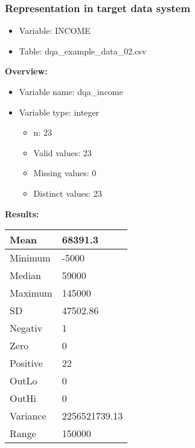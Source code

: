 \documentclass[
]{article}
\providecommand{\tightlist}{%
  \setlength{\itemsep}{0pt}\setlength{\parskip}{0pt}}
\begin{document}
\newpage

\hypertarget{representation-in-target-data-system-7}{%
\subsubsection{\texorpdfstring{Representation in \textbf{target} data
system}{Representation in target data system}}\label{representation-in-target-data-system-7}}

\begin{itemize}
\tightlist
\item
  Variable: INCOME
\item
  Table: dqa\_example\_data\_02.csv
\end{itemize}

\textbf{Overview:}

\begin{itemize}
\tightlist
\item
  Variable name: dqa\_income
\item
  Variable type: integer

  \begin{itemize}
  \tightlist
  \item
    n: 23
  \item
    Valid values: 23
  \item
    Missing values: 0
  \item
    Distinct values: 23
  \end{itemize}
\end{itemize}

\textbf{Results:}\\

\begin{table}[H]
\centering
\begin{tabular}{l|l}
\hline
Mean & 68391.3\\
\hline
Minimum & -5000\\
\hline
Median & 59000\\
\hline
Maximum & 145000\\
\hline
SD & 47502.86\\
\hline
Negativ & 1\\
\hline
Zero & 0\\
\hline
Positive & 22\\
\hline
OutLo & 0\\
\hline
OutHi & 0\\
\hline
Variance & 2256521739.13\\
\hline
Range & 150000\\
\hline
\end{tabular}
\end{table}
\end{document}
